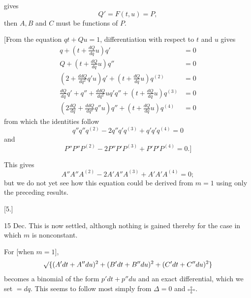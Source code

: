 %
\noindent gives
\[
Q'=F(t,u)=P,
\]
then $A,B$ and $C$ must be functions of $P$.

[From the equation $qt+Qu=1$, differentiation with respect to $t$ and $u$ gives
\[
\begin{aligned}
q+\left(t+\frac{dQ}{dq}u\right)q'&=0\\
Q+\left(t+\frac{dQ}{dq}u\right)q''&=0\\
\left(2+\frac{ddQ}{dq^2}q'u\right)q'+\left(t+\frac{dQ}{dq}u\right)q^{(2)}&=0\\
\frac{dQ}{dq}q'+q''+\frac{ddQ}{dq^2}u q'q''+\left(t+\frac{dQ}{dq}u\right)q^{(3)}&=0\\
\left(2\frac{dQ}{dq}+\frac{ddQ}{dq^2}q''u\right)q''+\left(t+\frac{dQ}{dq}u\right)q^{(4)}&=0
\end{aligned}
\]
from which the identities follow
\[
q''q''q^{(2)}-2q''q'q^{(3)}+q'q'q^{(4)}=0
\]
and
\[
P''P''P^{(2)}-2P''P'P^{(3)}+P'P'P^{(4)}=0.]
\]
\par\indent This gives
\[
A''A''A^{(2)}-2A'A''A^{(3)}+A'A'A^{(4)}=0;
\]
but we do not yet see how this equation could be derived from $m=1$ using only the preceding results.
\begin{center}[5.]\end{center}
\noindent\hspace*{1.2em} 15 Dec. This is now settled, although nothing is gained thereby for the case in which $m$ is nonconstant.

For [when $m=1$],
\[
\mathord{\surd}\{(A'dt+A''du)^2+(B'dt+B''du)^2+(C'dt+C''du)^2\}
\]
becomes a binomial of the form $p'dt+p''du$ and an exact differential, which we set $=dq$. This seems to follow most simply from $\Delta=0$ and $\FourRingCross$.
